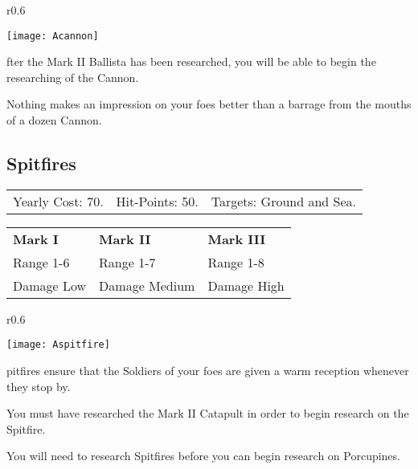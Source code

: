 \begin{wrapfigure}{r}{0.6\textwidth}
	\vspace{-20pt}
	\begin{center}
		\texttt{[image: Acannon]} %
	\end{center}
	\vspace{-50pt}
\end{wrapfigure}

fter the Mark II Ballista has been researched, you will be able to begin the researching of the Cannon.

Nothing makes an impression on your foes better than a barrage from the mouths of a dozen Cannon.

\clearpage

\subsection{Spitfires}


\begin{tabular}{p{1.264in} p{1.264in} p{1.264in}}
	Yearly Cost: 70. & Hit-Points: 50. & Targets: Ground and Sea.
\end{tabular}

\begin{tabular}{| p{1.264in} p{1.264in} p{1.264in}|}
	\hline
	\textbf{Mark I}	& \textbf{Mark II} & \textbf{Mark III} \\ 
	Range 1-6 & Range 1-7 & Range 1-8 \\ 
	Damage Low & Damage Medium & Damage High \\ 
	\hline
\end{tabular}

\begin{wrapfigure}{r}{0.6\textwidth}
	\vspace{-20pt}
	\begin{center}
		\texttt{[image: Aspitfire]} %
	\end{center}
	\vspace{-20pt}
\end{wrapfigure}

pitfires ensure that the Soldiers of your foes are given a warm reception whenever they stop by.

You must have researched the Mark II Catapult in order to begin research on the Spitfire. 

You will need to research Spitfires before you can begin research on Porcupines.

